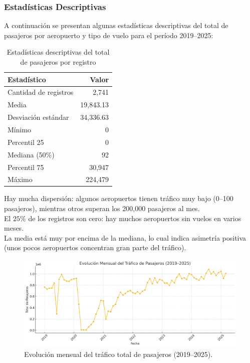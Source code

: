 \documentclass[11pt, a4paper, twocolumn]{article}
\begin{document}
\subsubsection*{Estadísticas Descriptivas}

A continuación se presentan algunas estadísticas descriptivas del total de pasajeros por aeropuerto y tipo de vuelo para el período 2019–2025:

\begin{table}[H]
\centering
\caption{Estadísticas descriptivas del total de pasajeros por registro}
\label{tab:estadisticas_descriptivas}
\begin{tabular}{lr}
\toprule
\textbf{Estadístico} & \textbf{Valor} \\
\midrule
Cantidad de registros & 2,741 \\
Media & 19,843.13 \\
Desviación estándar & 34,336.63 \\
Mínimo & 0 \\
Percentil 25 & 0 \\
Mediana (50\%) & 92 \\
Percentil 75 & 30,947 \\
Máximo & 224,479 \\
\bottomrule
\end{tabular}
\end{table}

Hay mucha dispersión: algunos aeropuertos tienen tráfico muy bajo (0–100 pasajeros), mientras otros superan los 200,000 pasajeros al mes. \\

El $25\%$ de los registros son cero: hay muchos aeropuertos sin vuelos en varios meses.\\

La media está muy por encima de la mediana, lo cual indica asimetría positiva (unos pocos aeropuertos concentran gran parte del tráfico).\\

\begin{figure}[H]
\centering
\includegraphics[width=\columnwidth]{image.png}
\caption{Evolución mensual del tráfico total de pasajeros (2019–2025).}
\label{fig:trafico_mensual}
\end{figure}
\end{document}
